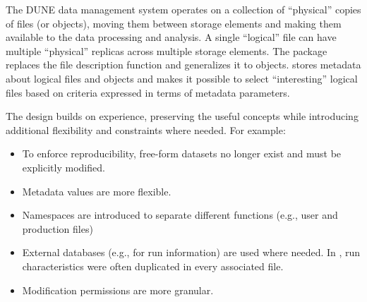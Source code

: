 \documentclass[../main-v1.tex]{subfiles}
\begin{document}
 
The DUNE data  management system operates on a collection of ``physical'' copies of files (or objects), moving them between storage elements and making them available to the data processing and analysis. 
A single  ``logical'' file can have multiple ``physical'' replicas across multiple storage elements. The  package replaces the  file description function and generalizes it to objects.  
 stores metadata about logical files and objects and makes it possible to select ``interesting'' logical files based on criteria expressed in terms of metadata parameters. 

The  design builds on  experience, preserving the useful concepts while introducing additional flexibility and constraints where needed.   For example:

\begin{itemize}  
\item To enforce reproducibility, %
free-form datasets no longer exist and  must be explicitly modified.
\item Metadata values are more flexible.
\item Namespaces are introduced to separate different functions (e.g., user %
and production files)
\item External databases (e.g., for run information) are used where needed.  In , run characteristics were often duplicated in every associated file.
\item Modification permissions are more granular.
\end{itemize} 
\end{document}
